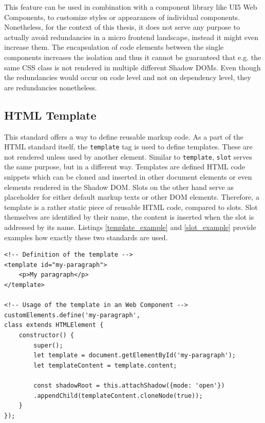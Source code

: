This feature can be used in combination with a component library like UI5 Web Components, to customize styles or appearances of individual components. Nonetheless, for the context of this thesis, it does not serve any purpose to actually avoid redundancies in a micro frontend landscape, instead it might even increase them. The encapsulation of code elements between the single components increases the isolation and thus it cannot be guaranteed that e.g. the same CSS class is not rendered in multiple different Shadow DOMs. Even though the redundancies would occur on code level and not on dependency level, they are redundancies nonetheless.

\subsection{HTML Template}

This standard offers a way to define reusable markup code. As a part of the HTML standard itself, the \texttt{template} tag is used to define templates. These are not rendered unless used by another element. Similar to \texttt{template}, \texttt{slot} serves the same purpose, but in a different way. Templates are defined HTML code snippets which can be cloned and inserted in other document elements or even elements rendered in the Shadow DOM.
Slots on the other hand serve as placeholder for either default markup texts or other DOM elements. Therefore, a template is a rather static piece of reusable HTML code, compared to slots.
Slot themselves are identified by their name, the content is inserted when the slot is addressed by its name.
Listings \ref{template_example} and \ref{slot_example} provide examples how exactly these two standards are used. \cite{wc_html_template_slots}

\begin{lstlisting}[caption=Definition and usage of the \texttt{template} standard \cite{wc_html_template_slots}, label=template_example]
<!-- Definition of the template -->
<template id="my-paragraph">
	<p>My paragraph</p>
</template>

<!-- Usage of the template in an Web Component -->
customElements.define('my-paragraph',
class extends HTMLElement {
	constructor() {
		super();
		let template = document.getElementById('my-paragraph');
		let templateContent = template.content;
		
		const shadowRoot = this.attachShadow({mode: 'open'})
		.appendChild(templateContent.cloneNode(true));
	}
});
\end{lstlisting}

